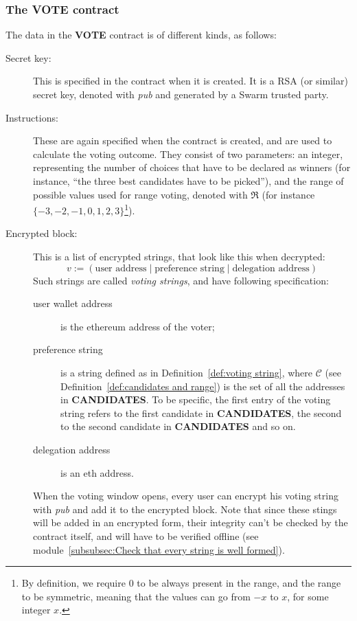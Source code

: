 \documentclass[submission, copyright,creativecommons,sharealike,noncommercial]{eptcs}
\newcommand{\candidates}{\ensuremath{\mathcal{C}} \xspace}
\newcommand{\range}{\ensuremath{\mathfrak{R}}\xspace}
\newcommand{\Candidates}{\textbf{CANDIDATES}\xspace}
\newcommand{\Vote}{\textbf{VOTE}\xspace}
\begin{document}
\subsubsection{The \Vote contract}
	The data in the \Vote contract is of different kinds, as follows:
	\begin{description}
		\item[Secret key:] This is specified in the contract when it is created. It is a RSA (or similar) secret key, denoted with \emph{pub} and generated by a Swarm trusted party.
			
		\item[Instructions:] These are again specified when the contract is created, and are used to calculate the voting outcome. They consist of two parameters: an integer, representing the number of choices that have to be declared as winners (for instance, ``the three best candidates have to be picked''), and the range of possible values used for range voting, denoted with $\range$ (for instance $\{-3,-2,-1,0,1,2,3\}$\footnote{By definition, we require $0$ to be always present in the range, and the range to be symmetric, meaning that the values can go from $-x$ to $x$, for some integer $x$.}).
		\item[Encrypted block:] This is a list of encrypted strings, that look like this when decrypted:
		\[
		v := (\text{user address} \mid \text{preference string} \mid \text{delegation address})
		\]
		Such strings are called \emph{voting strings}, and have following specification:
		\begin{description}
			\item[user wallet address] is the ethereum address of the voter;
			\item[preference string] is a string defined as in Definition~\ref{def:voting string}, where $\candidates$ (see Definition~\ref{def:candidates and range}) is the set of all the addresses in \Candidates. To be specific, the first entry of the voting string refers to the first candidate in \Candidates, the second to the second candidate in \Candidates and so on.
			\item[delegation address] is an eth address.
		\end{description}
		When the voting window opens, every user can encrypt his voting string with \emph{pub} and add it to the encrypted block.
		Note that since these stings will be added in an encrypted form, their integrity can't be checked by the contract itself, and will have to be verified offline (see module~\ref{subsubsec:Check that every string is well formed}).
		

\end{description}
\end{document}

